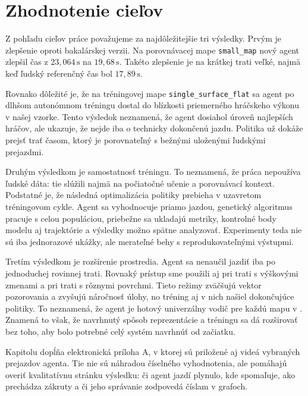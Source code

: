 \section{Zhodnotenie cieľov}

Z pohľadu cieľov práce považujeme za najdôležitejšie tri výsledky. Prvým je zlepšenie oproti bakalárskej verzii. Na porovnávacej mape \texttt{small\_map} nový agent zlepšil čas z \(23{,}064\,\mathrm{s}\) na \(19{,}68\,\mathrm{s}\). Takéto zlepšenie je na krátkej trati veľké, najmä keď ľudský referenčný čas bol \(17{,}89\,\mathrm{s}\).

Rovnako dôležité je, že na tréningovej mape \texttt{single\_surface\_flat} sa agent po dlhšom autonómnom tréningu dostal do blízkosti priemerného hráčskeho výkonu v našej vzorke. Tento výsledok neznamená, že agent dosiahol úroveň najlepších hráčov, ale ukazuje, že nejde iba o technicky dokončenú jazdu. Politika už dokáže prejsť trať časom, ktorý je porovnateľný s bežnými uloženými ľudskými prejazdmi.

Druhým výsledkom je samostatnosť tréningu. To neznamená, že práca nepoužíva ľudské dáta: tie slúžili najmä na počiatočné učenie a porovnávací kontext. Podstatné je, že následná optimalizácia politiky prebieha v uzavretom tréningovom cykle. Agent sa vyhodnocuje priamo jazdou, genetický algoritmus pracuje s celou populáciou, priebežne sa ukladajú metriky, kontrolné body modelu aj trajektórie a výsledky možno spätne analyzovať. Experimenty teda nie sú iba jednorazové ukážky, ale merateľné behy s reprodukovateľnými výstupmi.

Tretím výsledkom je rozšírenie prostredia. Agent sa nenaučil jazdiť iba po jednoduchej rovinnej trati. Rovnaký prístup sme použili aj pri trati s výškovými zmenami a pri trati s rôznymi povrchmi. Tieto režimy zväčšujú vektor pozorovania a zvyšujú náročnosť úlohy, no tréning aj v nich našiel dokončujúce politiky. To neznamená, že agent je hotový univerzálny vodič pre každú mapu v \Trackmania{}. Znamená to však, že navrhnutý spôsob reprezentácie a tréningu sa dá rozširovať bez toho, aby bolo potrebné celý systém navrhnúť od začiatku.

Kapitolu dopĺňa elektronická príloha A, v ktorej sú priložené aj videá vybraných prejazdov agenta. Tie nie sú náhradou číselného vyhodnotenia, ale pomáhajú overiť kvalitatívnu stránku výsledku: či agent jazdí plynulo, kde spomaľuje, ako prechádza zákruty a či jeho správanie zodpovedá číslam v grafoch.

\FloatBarrier
